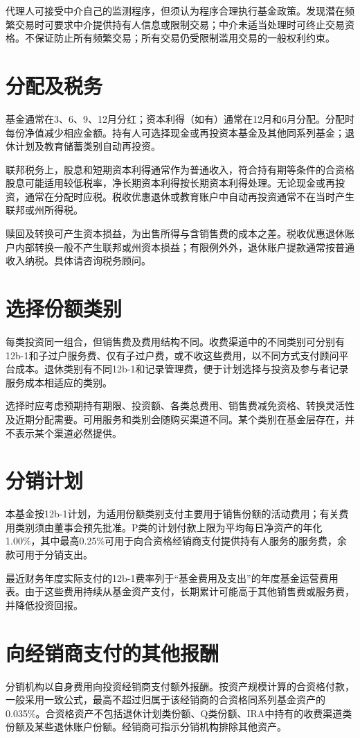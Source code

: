 \documentclass[UTF8,fontset=none,11pt,a4paper]{ctexart}
\begin{document}
代理人可接受中介自己的监测程序，但须认为程序合理执行基金政策。发现潜在频繁交易时可要求中介提供持有人信息或限制交易；中介未适当处理时可终止交易资格。不保证防止所有频繁交易；所有交易仍受限制滥用交易的一般权利约束。


\section*{分配及税务}
基金通常在3、6、9、12月分红；资本利得（如有）通常在12月和6月分配。分配时每份净值减少相应金额。持有人可选择现金或再投资本基金及其他同系列基金；退休计划及教育储蓄类别自动再投资。


联邦税务上，股息和短期资本利得通常作为普通收入，符合持有期等条件的合资格股息可能适用较低税率，净长期资本利得按长期资本利得处理。无论现金或再投资，通常在分配时应税。税收优惠退休或教育账户中自动再投资通常不在当时产生联邦或州所得税。


赎回及转换可产生资本损益，为出售所得与含销售费的成本之差。税收优惠退休账户内部转换一般不产生联邦或州资本损益；有限例外外，退休账户提款通常按普通收入纳税。具体请咨询税务顾问。


\section*{选择份额类别}
每类投资同一组合，但销售费及费用结构不同。收费渠道中的不同类别可分别有12b-1和子过户服务费、仅有子过户费，或不收这些费用，以不同方式支付顾问平台成本。退休类别有不同12b-1和记录管理费，便于计划选择与投资及参与者记录服务成本相适应的类别。


选择时应考虑预期持有期限、投资额、各类总费用、销售费减免资格、转换灵活性及近期分配需要。可用服务和类别会随购买渠道不同。某个类别在基金层存在，并不表示某个渠道必然提供。


\section*{分销计划}
本基金按12b-1计划，为适用份额类别支付主要用于销售份额的活动费用；有关费用类别须由董事会预先批准。P类的计划付款上限为平均每日净资产的年化1.00\%，其中最高0.25\%可用于向合资格经销商支付提供持有人服务的服务费，余款可用于分销支出。


最近财务年度实际支付的12b-1费率列于“基金费用及支出”的年度基金运营费用表。由于这些费用持续从基金资产支付，长期累计可能高于其他销售费或服务费，并降低投资回报。


\section*{向经销商支付的其他报酬}
分销机构以自身费用向投资经销商支付额外报酬。按资产规模计算的合资格付款，一般采用一致公式，最高不超过归属于该经销商的合资格同系列基金资产的0.035\%。合资格资产不包括退休计划类份额、Q类份额、IRA中持有的收费渠道类份额及某些退休账户份额。经销商可指示分销机构排除其他资产。
\end{document}
